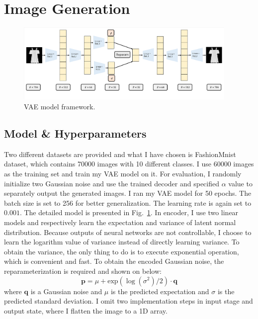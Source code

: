 
\section{Image Generation}
\begin{figure}[htbp]
    \centering
    \includegraphics[width=0.95\textwidth]{vae_model.pdf}
    \caption{VAE model framework. }
    \label{fig:vae_model}
\end{figure}
\subsection{Model \& Hyperparameters}
Two different datasets are provided and what I have chosen is FashionMnist dataset, which contains 70000 images with 10 different classes. 
I use 60000 images as the training set and train my VAE model on it.
For evaluation, I randomly initialize two Gaussian noise and use the trained decoder and specified $\alpha$ value to separately output the generated images.
\newline
\newline
\noindent 
I ran my VAE model for 50 epochs.
The batch size is set to 256 for better generalization.
The learning rate is again set to $0.001$.
The detailed model is presented in Fig.~\ref{fig:vae_model}.
In encoder, I use two linear models and respectively learn the expectation and variance of latent normal distribution.
Because outputs of neural networks are not controllable, I choose to learn the logarithm value of variance instead of directly learning variance.
To obtain the variance, the only thing to do is to execute exponential operation, which is convenient and fast.
To obtain the encoded Gaussian noise, the reparameterization is required and shown on below:
\begin{equation}
    \boldsymbol{p} = \mu + \mathrm{exp}(\log(\sigma ^2) / 2)\cdot \boldsymbol{q}
\end{equation}
where $\boldsymbol{q}$ is a Gaussian noise and $\mu$ is the predicted expectation and $\sigma$ is the predicted standard deviation. 
I omit two implementation steps in input stage and output state, where I flatten the image to a 1D array.

